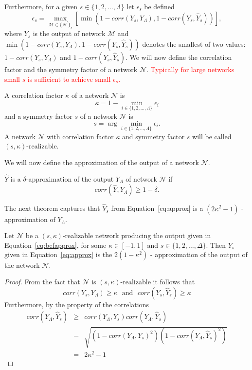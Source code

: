\documentclass[twoside]{article}
\begin{document}
Furthermore, for a given $s \in \{1,2,\dots,\Lambda\}$ let $\epsilon_s$ be defined
\[\epsilon_s = \max_{\mathcal{M} \in \{\mathcal{N}^{'}\}_s}[\min(1-corr(Y_s,Y_{\Lambda}),1-corr(Y_s,\hat{Y}_s))],
\] 
where $Y_s$ is the output of network $\mathcal{M}$ and $\min(1-corr(Y_s,Y_{\Lambda}),1-corr(Y_s,\hat{Y}_s))$ denotes the smallest of two values: $1-corr(Y_s,Y_{\Lambda})$ and $1-corr(Y_s,\hat{Y}_s)$. We will now define the correlation factor and the symmetry factor of a network $\mathcal{N}$. \textcolor{red}{Typically for large networks small $s$ is sufficient to achieve small $\epsilon_s$.}
\begin{definition}
A correlation factor $\kappa$ of a network $\mathcal{N}$ is
\[\kappa = 1 - \min_{i \in \{1,2,\dots,\Lambda\}} \epsilon_i
\]
and a symmetry factor $s$ of a network $\mathcal{N}$ is
\[s = \arg\min_{i \in \{1,2,\dots,\Lambda\}} \epsilon_i.
\]
A network $\mathcal{N}$ with correlation factor $\kappa$ and symmetry factor $s$ will be called $(s,\kappa)$-realizable.
\end{definition}
We will now define the approximation of the output of a network $\mathcal{N}$.
\begin{definition}
$\hat{Y}$ is a $\delta$-approximation of the output $Y_{\Lambda}$ of network $\mathcal{N}$ if
\[corr(\hat{Y},Y_\Lambda) \geq 1-\delta.
\]
\end{definition}
The next theorem captures that $\hat{Y}_s$ from Equation~\ref{eq:approx} is a $(2\kappa^2-1)$ - approximation of $Y_{\Lambda}$.
\begin{theorem}
Let $\mathcal{N}$ be a $(s,\kappa)$-realizable network producing the output given in Equation~\ref{eq:befapprox}, for some $\kappa \in [-1,1]$ and $s \in \{1,2,\dots,\Delta\}$. Then $Y_s$ given in Equation~\ref{eq:approx} is the $2(1-\kappa^2)$ - approximation of the output of the network $\mathcal{N}$.
\end{theorem}
\begin{proof}
From the fact that $\mathcal{N}$ is $(s,\kappa)$-realizable it follows that 
\[corr(Y_s,Y_{\Lambda}) \geq \kappa \:\:\:\text{and}\:\:\:corr(Y_s,\hat{Y}_s) \geq \kappa
\]
Furthermore, by the property of the correlations
\begin{eqnarray*}
corr(Y_{\Lambda},\hat{Y}_s) \!\!\!\!\!&\geq&\!\!\!\!\! corr(Y_{\Lambda},Y_s)corr(Y_{\Lambda},\hat{Y}_s)\\
&-&\!\!\!\!\! \sqrt{(1 \!-\! corr(Y_{\Lambda},Y_s)^2)(1 \!-\! corr(Y_{\Lambda},\hat{Y}_s)^2)}\\
&=&2\kappa^2-1
\end{eqnarray*}
\end{proof}
\end{document}
